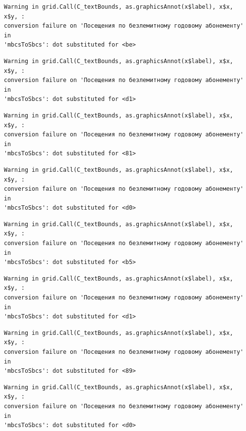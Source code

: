 \documentclass[
  letterpaper,
  DIV=11,
  numbers=noendperiod]{scrartcl}
\begin{document}
\begin{verbatim}
Warning in grid.Call(C_textBounds, as.graphicsAnnot(x$label), x$x, x$y, :
conversion failure on 'Посещения по безлемитному годовому абонементу' in
'mbcsToSbcs': dot substituted for <be>
\end{verbatim}

\begin{verbatim}
Warning in grid.Call(C_textBounds, as.graphicsAnnot(x$label), x$x, x$y, :
conversion failure on 'Посещения по безлемитному годовому абонементу' in
'mbcsToSbcs': dot substituted for <d1>
\end{verbatim}

\begin{verbatim}
Warning in grid.Call(C_textBounds, as.graphicsAnnot(x$label), x$x, x$y, :
conversion failure on 'Посещения по безлемитному годовому абонементу' in
'mbcsToSbcs': dot substituted for <81>
\end{verbatim}

\begin{verbatim}
Warning in grid.Call(C_textBounds, as.graphicsAnnot(x$label), x$x, x$y, :
conversion failure on 'Посещения по безлемитному годовому абонементу' in
'mbcsToSbcs': dot substituted for <d0>
\end{verbatim}

\begin{verbatim}
Warning in grid.Call(C_textBounds, as.graphicsAnnot(x$label), x$x, x$y, :
conversion failure on 'Посещения по безлемитному годовому абонементу' in
'mbcsToSbcs': dot substituted for <b5>
\end{verbatim}

\begin{verbatim}
Warning in grid.Call(C_textBounds, as.graphicsAnnot(x$label), x$x, x$y, :
conversion failure on 'Посещения по безлемитному годовому абонементу' in
'mbcsToSbcs': dot substituted for <d1>
\end{verbatim}

\begin{verbatim}
Warning in grid.Call(C_textBounds, as.graphicsAnnot(x$label), x$x, x$y, :
conversion failure on 'Посещения по безлемитному годовому абонементу' in
'mbcsToSbcs': dot substituted for <89>
\end{verbatim}

\begin{verbatim}
Warning in grid.Call(C_textBounds, as.graphicsAnnot(x$label), x$x, x$y, :
conversion failure on 'Посещения по безлемитному годовому абонементу' in
'mbcsToSbcs': dot substituted for <d0>
\end{verbatim}
\end{document}
